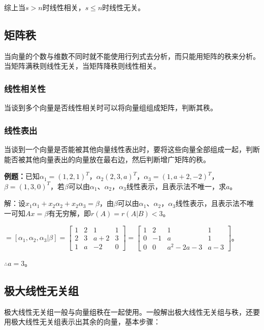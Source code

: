\documentclass[UTF8, 12pt]{ctexart}
\begin{document}
综上当$s>n$时线性相关，$s\leqslant n$时线性无关。

\subsection{矩阵秩}

当向量的个数与维数不同时就不能使用行列式去分析，而只能用矩阵的秩来分析。当矩阵满秩则线性无关，当矩阵降秩则线性相关。

\subsubsection{线性相关性}

当谈到多个向量是否线性相关时可以将向量组组成矩阵，判断其秩。

\subsubsection{线性表出}

当谈到一个向量是否能被其他向量线性表出时，要将这些向量全部组成一起，判断能否被其他向量表出的向量放在最右边，然后判断增广矩阵的秩。

\textbf{例题：}已知$\alpha_1=(1,2,1)^T$，$\alpha_2(2,3,a)^T$，$\alpha_3=(1,a+2,-2)^T$，$\beta=(1,3,0)^T$，若$\beta$可以由$\alpha_1$、$\alpha_2$，$\alpha_3$线性表示，且表示法不唯一，求$a$。

解：设$x_1\alpha_1+x_2\alpha_2+x_2\alpha_3=\beta$，由$\beta$可以由$\alpha_1$、$\alpha_2$，$\alpha_3$线性表示，且表示法不唯一可知$Ax=\beta$有无穷解，即$r(A)=r(A|B)<3$。

$=[\alpha_1,\alpha_2,\alpha_3|\beta]=\left[\begin{array}{cccc}
    1 & 2 & 1 & 1 \\
    2 & 3 & a+2 & 3 \\
    1 & a & -2 & 0
\end{array}\right]=\left[\begin{array}{cccc}
    1 & 2 & 1 & 1 \\
    0 & -1 & a & 1 \\
    0 & 0 & a^2-2a-3 & a-3
\end{array}\right]$。

$\therefore a=3$。

\subsection{极大线性无关组}

极大线性无关组一般与向量组秩在一起使用。一般解出极大线性无关组与秩，还要用极大线性无关组表示出其余的向量，基本步骤：
\end{document}

